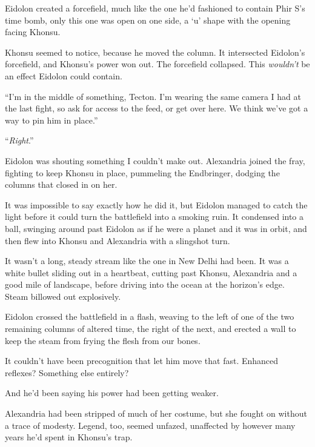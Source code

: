 Eidolon created a forcefield, much like the one he'd fashioned to contain Phir S's time bomb, only this one was open on one side, a `u' shape with the opening facing Khonsu.



Khonsu seemed to notice, because he moved the column.  It intersected Eidolon's forcefield, and Khonsu's power won out.  The forcefield collapsed.  This \emph{wouldn't} be an effect Eidolon could contain.



``I'm in the middle of something, Tecton.  I'm wearing the same camera I had at the last fight, so ask for access to the feed, or get over here.  We think we've got a way to pin him in place.''



``\emph{Right}.''



Eidolon was shouting something I couldn't make out.  Alexandria joined the fray, fighting to keep Khonsu in place, pummeling the Endbringer, dodging the columns that closed in on her.



It was impossible to say exactly how he did it, but Eidolon managed to catch the light before it could turn the battlefield into a smoking ruin.  It condensed into a ball, swinging around past Eidolon as if he were a planet and it was in orbit, and then flew into Khonsu and Alexandria with a slingshot turn.



It wasn't a long, steady stream like the one in New Delhi had been.  It was a white bullet sliding out in a heartbeat, cutting past Khonsu, Alexandria and a good mile of landscape, before driving into the ocean at the horizon's edge.  Steam billowed out explosively.



Eidolon crossed the battlefield in a flash, weaving to the left of one of the two remaining columns of altered time, the right of the next, and erected a wall to keep the steam from frying the flesh from our bones.



It couldn't have been precognition that let him move that fast.  Enhanced reflexes?  Something else entirely?



And he'd been saying his power had been getting weaker.



Alexandria had been stripped of much of her costume, but she fought on without a trace of modesty.  Legend, too, seemed unfazed, unaffected by however many years he'd spent in Khonsu's trap.



